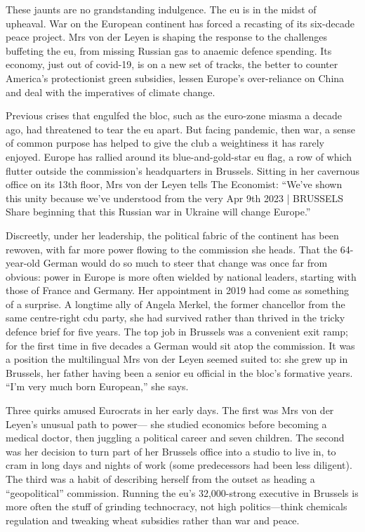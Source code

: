 \documentclass[10pt, a4paper, oneside]{article}
\begin{document}
\begin{spacing}{2.0}
These jaunts are no grandstanding indulgence. The eu is in the midst of upheaval. War on the European
continent has forced a recasting of its six-decade peace project. Mrs von der Leyen is shaping the response to the challenges 
buffeting the eu, from missing Russian gas to anaemic defence spending. Its economy, just out of covid-19, is on a new set of tracks, 
the better to counter America's protectionist green subsidies, lessen Europe's over-reliance on China and deal with the imperatives of 
climate change.

Previous crises that engulfed the bloc, such as the euro-zone miasma a decade ago, had threatened to tear
the eu apart. But facing pandemic, then war, a sense of common purpose has helped to give the club a
weightiness it has rarely enjoyed. Europe has rallied around its blue-and-gold-star eu flag, a row of which flutter outside the commission's 
headquarters in Brussels. Sitting in her cavernous office on its 13th floor, Mrs von der Leyen tells The Economist: 
“We've shown this unity because we've understood from the very Apr 9th 2023 | BRUSSELS Share beginning that this Russian war in 
Ukraine will change Europe.”

Discreetly, under her leadership, the political fabric of the continent has been rewoven, with far more power flowing to the commission 
she heads. That the 64-year-old German would do so much to steer that change was once far from obvious: power in Europe is more often 
wielded by national leaders, starting with those of France and Germany. Her appointment in 2019 had come as something of a surprise. 
A longtime ally of Angela Merkel, the former chancellor from the same centre-right cdu party, she had survived rather than
thrived in the tricky defence brief for five years. The top job in Brussels was a convenient exit ramp; for the first time in five 
decades a German would sit atop the commission. It was a position the multilingual Mrs von der Leyen seemed suited to: she grew up in 
Brussels, her father having been a senior eu official in the bloc's formative years. “I'm very much born European,” she says.

Three quirks amused Eurocrats in her early days. The first was Mrs von der Leyen's unusual path to power—
she studied economics before becoming a medical doctor, then juggling a political career and seven
children. The second was her decision to turn part of her Brussels office into a studio to live in, to cram in long days and nights 
of work (some predecessors had been less diligent). The third was a habit of describing herself from the outset as heading a 
“geopolitical” commission. Running the eu's 32,000-strong executive in Brussels is more often the stuff of grinding technocracy, 
not high politics—think chemicals regulation and tweaking wheat subsidies rather than war and peace.


\end{spacing}
\end{document}
